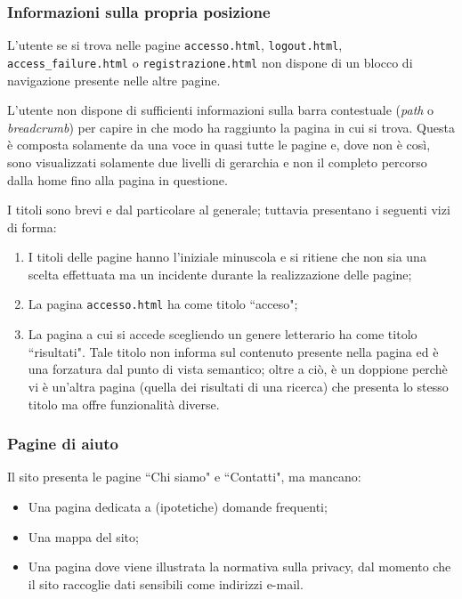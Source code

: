\subsubsection{Informazioni sulla propria posizione}
L'utente se si trova nelle pagine \texttt{accesso.html}, \texttt{logout.html},
\texttt{access_failure.html} o \texttt{registrazione.html} non dispone di un
blocco di navigazione presente nelle altre pagine.

L'utente non dispone di sufficienti informazioni sulla barra contestuale
(\textit{path} o \textit{breadcrumb}) per capire in che modo ha raggiunto la
pagina in cui si trova. Questa è composta solamente da una voce in quasi tutte
le pagine e, dove non è così, sono visualizzati solamente due livelli di
gerarchia e non il completo percorso dalla home fino alla pagina in questione.

I titoli sono brevi e dal particolare al generale; tuttavia presentano i
seguenti vizi di forma:
\begin{enumerate}
\item I titoli delle pagine hanno l'iniziale minuscola e si ritiene che non sia
una scelta effettuata ma un incidente durante la realizzazione delle pagine;
\item La pagina \texttt{accesso.html} ha come titolo ``acceso";
\item La pagina a cui si accede scegliendo un genere letterario ha come titolo
``risultati". Tale titolo non informa sul contenuto presente nella pagina ed è
una forzatura dal punto di vista semantico; oltre a ciò, è un doppione perchè
vi è un'altra pagina (quella dei risultati di una ricerca) che presenta lo
stesso titolo ma offre funzionalità diverse.
\end{enumerate}

\subsubsection{Pagine di aiuto}
Il sito presenta le pagine ``Chi siamo" e ``Contatti", ma mancano:
\begin{itemize}
\item Una pagina dedicata a (ipotetiche) domande frequenti;
\item Una mappa del sito;
\item Una pagina dove viene illustrata la normativa sulla privacy, dal momento
che il sito raccoglie dati sensibili come indirizzi e-mail.
\end{itemize}